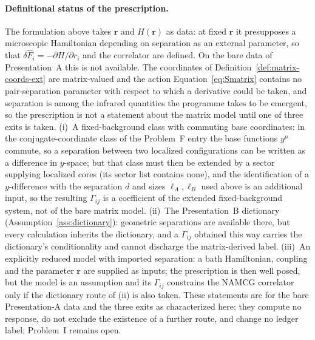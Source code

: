 \paragraph{Definitional status of the prescription.} The formulation above takes \(\mathbf r\) and \(H(\mathbf r)\) as data: at fixed \(\mathbf r\) it presupposes a microscopic Hamiltonian depending on separation as an external parameter, so that \(\delta\hat F_i=-\partial H/\partial r_i\) and the correlator are defined. On the bare data of Presentation~A this is not available. The coordinates of Definition~\ref{def:matrix-coords-ext} are matrix-valued and the action Equation~\eqref{eq:Smatrix} contains no pair-separation parameter with respect to which a derivative could be taken, and separation is among the infrared quantities the programme takes to be emergent, so the prescription is not a statement about the matrix model until one of three exits is taken. (i)~A fixed-background class with commuting base coordinates: in the conjugate-coordinate class of the Problem~F entry the base functions \(y^\mu\) commute, so a separation between two localized configurations can be written as a difference in \(y\)-space; but that class must then be extended by a sector supplying localized cores (its sector list contains none), and the identification of a \(y\)-difference with the separation \(d\) and sizes \(\ell_A,\ell_B\) used above is an additional input, so the resulting \(\Gamma_{ij}\) is a coefficient of the extended fixed-background system, not of the bare matrix model. (ii)~The Presentation~B dictionary (Assumption~\ref{ass:dictionary}): geometric separations are available there, but every calculation inherits the dictionary, and a \(\Gamma_{ij}\) obtained this way carries the dictionary's conditionality and cannot discharge the matrix-derived label. (iii)~An explicitly reduced model with imported separation: a bath Hamiltonian, coupling and the parameter \(\mathbf r\) are supplied as inputs; the prescription is then well posed, but the model is an assumption and its \(\Gamma_{ij}\) constrains the NAMCG correlator only if the dictionary route of (ii) is also taken. These statements are for the bare Presentation-A data and the three exits as characterized here; they compute no response, do not exclude the existence of a further route, and change no ledger label; Problem~I remains open.


